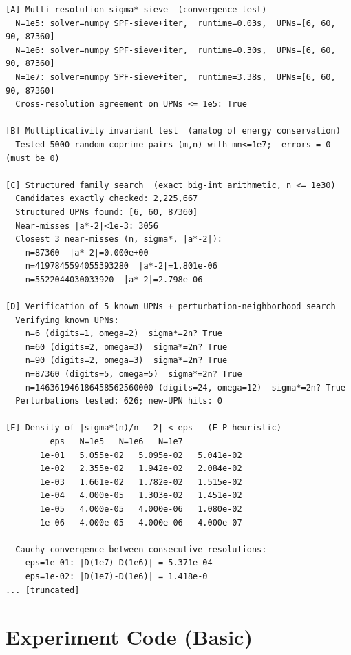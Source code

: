 \documentclass[11pt]{article}
\begin{document}
\begin{lstlisting}
[A] Multi-resolution sigma*-sieve  (convergence test)
  N=1e5: solver=numpy SPF-sieve+iter,  runtime=0.03s,  UPNs=[6, 60, 90, 87360]
  N=1e6: solver=numpy SPF-sieve+iter,  runtime=0.30s,  UPNs=[6, 60, 90, 87360]
  N=1e7: solver=numpy SPF-sieve+iter,  runtime=3.38s,  UPNs=[6, 60, 90, 87360]
  Cross-resolution agreement on UPNs <= 1e5: True

[B] Multiplicativity invariant test  (analog of energy conservation)
  Tested 5000 random coprime pairs (m,n) with mn<=1e7;  errors = 0  (must be 0)

[C] Structured family search  (exact big-int arithmetic, n <= 1e30)
  Candidates exactly checked: 2,225,667
  Structured UPNs found: [6, 60, 87360]
  Near-misses |a*-2|<1e-3: 3056
  Closest 3 near-misses (n, sigma*, |a*-2|):
    n=87360  |a*-2|=0.000e+00
    n=4197845594055393280  |a*-2|=1.801e-06
    n=5522044030033920  |a*-2|=2.798e-06

[D] Verification of 5 known UPNs + perturbation-neighborhood search
  Verifying known UPNs:
    n=6 (digits=1, omega=2)  sigma*=2n? True
    n=60 (digits=2, omega=3)  sigma*=2n? True
    n=90 (digits=2, omega=3)  sigma*=2n? True
    n=87360 (digits=5, omega=5)  sigma*=2n? True
    n=146361946186458562560000 (digits=24, omega=12)  sigma*=2n? True
  Perturbations tested: 626; new-UPN hits: 0

[E] Density of |sigma*(n)/n - 2| < eps   (E-P heuristic)
         eps   N=1e5   N=1e6   N=1e7
       1e-01   5.055e-02   5.095e-02   5.041e-02
       1e-02   2.355e-02   1.942e-02   2.084e-02
       1e-03   1.661e-02   1.782e-02   1.515e-02
       1e-04   4.000e-05   1.303e-02   1.451e-02
       1e-05   4.000e-05   4.000e-06   1.080e-02
       1e-06   4.000e-05   4.000e-06   4.000e-07

  Cauchy convergence between consecutive resolutions:
    eps=1e-01: |D(1e7)-D(1e6)| = 5.371e-04
    eps=1e-02: |D(1e7)-D(1e6)| = 1.418e-0
... [truncated]
\end{lstlisting}


\section{Experiment Code (Basic)}
\end{document}
